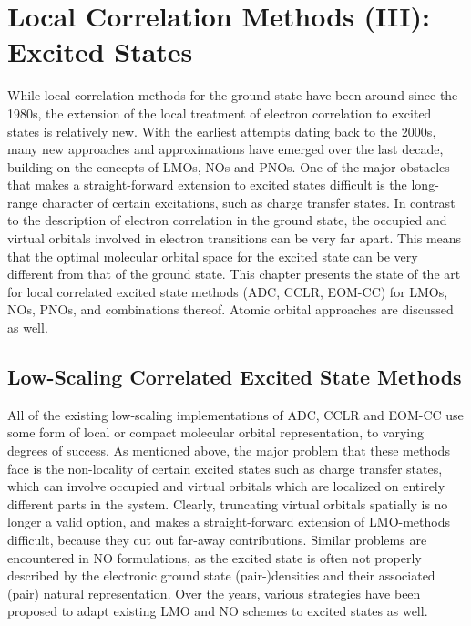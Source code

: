 \chapter{Local Correlation Methods (III): Excited States}

While local correlation methods for the ground state have been around since the 1980s, the extension of the local treatment of electron correlation to excited states is relatively new. With the earliest attempts dating back to the 2000s, many new approaches and approximations have emerged over the last decade, building on the concepts of LMOs, NOs and PNOs. One of the major obstacles that makes a straight-forward extension to excited states difficult is the long-range character of certain excitations, such as charge transfer states. In contrast to the description of electron correlation in the ground state, the occupied and virtual orbitals involved in electron transitions can be very far apart. This means that the optimal molecular orbital space for the excited state can be very different from that of the ground state. This chapter presents the state of the art for local correlated excited state methods (ADC, CCLR, EOM-CC) for LMOs, NOs, PNOs, and combinations thereof. Atomic orbital approaches are discussed as well. 



\section{Low-Scaling Correlated Excited State Methods}

All of the existing low-scaling implementations of ADC, CCLR and EOM-CC use some form of local or compact molecular orbital representation, to varying degrees of success. As mentioned above, the major problem that these methods face is the non-locality of certain excited states such as charge transfer states, which can involve occupied and virtual orbitals which are localized on entirely different parts in the system. Clearly, truncating virtual orbitals spatially is no longer a valid option, and makes a straight-forward extension of LMO-methods difficult, because they cut out far-away contributions. Similar problems are encountered in NO formulations, as the excited state is often not properly described by the electronic ground state (pair-)densities and their associated (pair) natural representation. Over the years, various strategies have been proposed to adapt existing LMO and NO schemes to excited states as well. 

